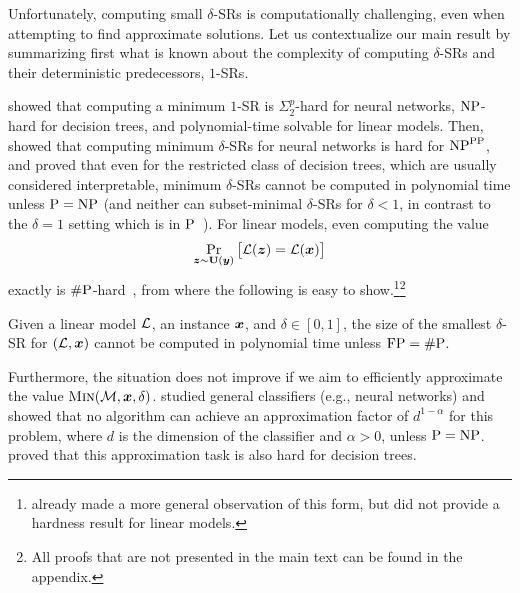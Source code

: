 

Unfortunately, computing small $\delta$-SRs is computationally challenging, even when attempting to find approximate solutions. Let us contextualize our main result by summarizing first what is known about the complexity of computing $\delta$-SRs and their deterministic predecessors, $1$-SRs.  

\citet{NEURIPS2020_b1adda14} showed that computing a minimum $1$-SR is $\Sigma_2^p$-hard for neural networks, $\mathrm{NP}$-hard for decision trees, and polynomial-time solvable for linear models. Then, \citet[Theorem 2.4]{Waldchen_MacDonald_Hauch_Kutyniok_2021} showed that computing minimum $\delta$-SRs for neural networks is hard for $\mathrm{NP}^{\mathrm{PP}}$, and \citet{NEURIPS2022_b8963f6a} proved that even for the restricted class of decision trees, which are usually considered interpretable, minimum $\delta$-SRs cannot be computed in polynomial time unless $\mathrm{P} = \mathrm{NP}$ (and neither can subset-minimal $\delta$-SRs for $\delta < 1$, in contrast to the $\delta = 1$ setting which is in $\mathrm{P}$~\citep{izzaExplainingDecisionTrees2020,roaModelInterpretabilityLens2020}). 
For linear models, even computing the value
\[
    \Pr_{{\bm{z}} \sim \mathbf{U}({\bm{y}})}\big[\mathcal{L}({\bm{z}}) = \mathcal{L}({\bm{x}})\big]
\]
exactly is $\mathrm{\#P}$-hard~\citep{NEURIPS2020_b1adda14}, from where the following is easy to show.\footnote{\citet{izzaComputingProbabilisticAbductive2023} already made a more general observation of this form, but did not provide a hardness result for linear models.}\footnote{All proofs that are not presented in the main text can be found in the appendix.}
 
\begin{proposition}\label{prop:hardness}
    Given a linear model $\mathcal{L}$, an instance
    ${\bm{x}}$, and $\delta \in [0,1]$, the size of the smallest $\delta$-SR for $(\mathcal{L}, {\bm{x}})$
    cannot be computed in polynomial time unless $\mathrm{FP} = \mathrm{\#P}$.
\end{proposition}

Furthermore, the situation does not improve if we aim to efficiently approximate the value $\operatorname{\textnormal{\textsc{Min}}}(\mathcal{M}, {\bm{x}}, \delta)$. \citet[Theorem 2.5]{Waldchen_MacDonald_Hauch_Kutyniok_2021} studied general classifiers (e.g., neural networks) and showed that no algorithm can achieve an approximation factor of $d^{1-\alpha}$ for this problem, where $d$ is the dimension of the classifier and $\alpha > 0$, unless $\mathrm{P} = \mathrm{NP}$. \citet{Kozachinskiy_2023} proved that this approximation task is also hard for decision trees.


